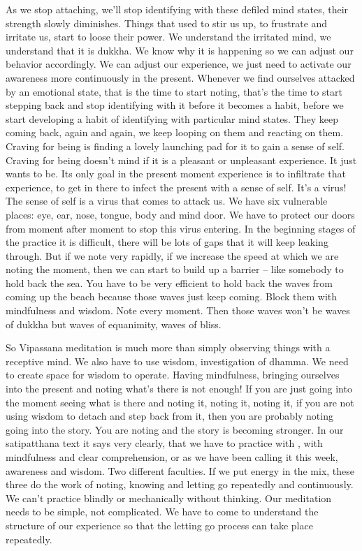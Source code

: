 \documentclass[letterpaper,10pt,english]{sphinxmanual}
\begin{document}
\sphinxAtStartPar
As  we  stop  attaching,  we’ll  stop  identifying  with  these  defiled  mind
states,  their  strength  slowly  diminishes.  Things  that  used  to  stir  us  up,  to
frustrate and irritate us, start to loose their power. We understand the irritated
mind, we understand that it is dukkha. We know why it is happening so we
can adjust our behavior accordingly. We can adjust our experience, we just
need to activate our awareness more continuously in the present. Whenever
  we  find  ourselves  attacked  by  an  emotional  state,  that  is  the  time  to  start
noting,  that’s  the  time  to  start  stepping  back  and  stop  identifying  with  it
before it becomes a habit, before we start developing a habit of identifying
with  particular  mind  states. They  keep  coming  back,  again  and  again,  we
keep looping on them and reacting on them. Craving for being is finding a
lovely launching pad for it to gain a sense of self. Craving for being doesn’t
mind if it is a pleasant or unpleasant experience. It just wants to be. Its only
goal in the present moment experience is to infiltrate that experience, to get
in there to infect the present with a sense of self. It’s a virus! The sense of
self is a virus that comes to attack us. We have six vulnerable places: eye,
ear, nose, tongue, body and mind door. We have to protect our doors from
moment after moment to stop this virus entering. In the beginning stages of
the practice it is difficult, there will be lots of gaps that it will keep leaking
through. But if we note very rapidly, if we increase the speed at which we are
noting the moment, then we can start to build up a barrier – like somebody to
hold back the sea. You have to be very efficient to hold back the waves from
coming  up  the  beach  because  those  waves  just  keep  coming.  Block  them
with mindfulness and wisdom. Note every moment. Then those waves won’t
be waves of dukkha but waves of equanimity, waves of bliss.

\sphinxAtStartPar
So Vipassana meditation is much more than simply observing things
with a receptive mind. We also have to use wisdom, investigation of dhamma.
We need to create space for wisdom to operate. Having mindfulness, bringing ourselves into the present and noting what’s there is not enough! If you
are just going into the moment seeing what is there and noting it, noting it,
noting it, if you are not using wisdom to detach and step back from it, then
you are probably noting going into the story. You are noting and the story
is  becoming  stronger.  In  our  satipatthana  text  it  says  very  clearly,  that  we
have  to  practice  with
,  with  mindfulness  and  clear  comprehension,  or  as  we  have  been  calling  it  this  week,  awareness  and  wisdom.
Two different faculties. If we put energy in the mix, these three do the work
of  noting,  knowing  and  letting  go  repeatedly  and  continuously.  We  can’t
practice blindly or mechanically without thinking. Our meditation needs to
be simple, not complicated. We have to come to understand the structure of
our experience so that the letting go process can take place repeatedly.
\end{document}
